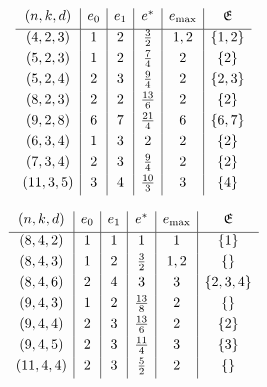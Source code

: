 \documentclass[12pt,dvipsnames,accepted=2016-08-18,a4paper,onecolumn]{quantumarticle}
\def\la{\lambda}
\def\la{\lambda}
\numberwithin{equation}{section}
\theoremstyle{definition}
\begin{document}
\begin{table}[ht]
\begin{minipage}[t]{0.48\textwidth}
\centering
\[
\begin{array}{c|c|c|c|c|c}
(n,k,d) & e_0 & e_1 & e^* & e_{\rm max} & \mathfrak E \\[1mm]
\hline
(4, 2, 3)& 1 & 2& \frac32 & {1, 2} & \{1, 2\}\\[1mm]
(5, 2, 3) &  1 & 2 & \frac74 & {2} & \{2\}\\[1mm]
(5, 2, 4) & 2 & 3 & \frac94 & {2} & \{2, 3\} \\[1mm]
(8, 2, 3) & 2 & 2 & \frac{13}6 & {2} & \{2\} \\[1mm]
(9, 2, 8) & 6 & 7 & \frac{21}4 & {6} & \{6, 7\} \\[1mm]
(6, 3, 4) &  1& 3 & 2 & {2} & \{2\} \\[1mm]
(7, 3, 4) & 2 & 3 & \frac94 & {2} & \{2\} \\[1mm]
(11, 3, 5) &  3 & 4 & \frac{10}3 & {3} & \{4\} \\[1mm]
\end{array}
\]
\end{minipage}
\hfill
\begin{minipage}[t]{0.48\textwidth}
\centering
\[
\begin{array}{c|c|c|c|c|c}
(n,k,d) & e_0 & e_1 & e^* & e_{\rm max} & \mathfrak E \\[1mm]
\hline
(8, 4, 2)& 1 & 1& 1 & {1} & \{1\}\\[1mm]
(8, 4, 3)& 1 & 2& \frac32 & {1,2} & \{\}\\[1mm]
(8, 4, 6)& 2 & 4& 3 & {3} & \{2,3,4\}\\[1mm]
(9, 4, 3)& 1 & 2& \frac{13}{8} & {2} & \{\}\\[1mm]
(9, 4, 4)& 2 & 3& \frac{13}{6} & {2} & \{2\}\\[1mm]
(9, 4, 5)& 2 & 3& \frac{11}{4} & {3} & \{3\}\\[1mm]
(11, 4, 4)& 2 & 3& \frac52 & {2} & \{\}\\[1mm]
\end{array}
\]
\end{minipage}
\caption{A selection of triples and the values of $e_0$, $e_1$, $e^*$, $e_{\rm max}$, and $\mathfrak{E}$ for these triples. The triple $(11,3,5)$ is an example where the optimal $\la=\mu\uplus\nu$ is not balanced. The triples on the right side demonstrate that any assortment of cases (a),(b),(c) in Corollary \ref{cor:dbip} can give rise to the maximum value. 
}
\label{tab:evalues}
\end{table}
\end{document}
